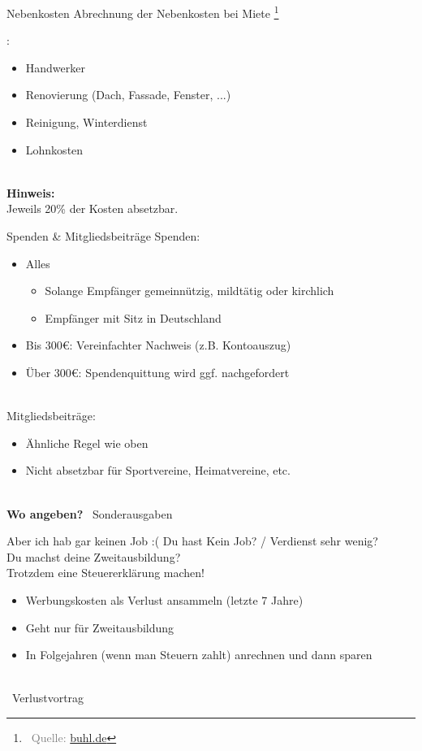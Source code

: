 \documentclass{beamer}
\newcommand{\n}{\hfill\\\vspace{0.25cm}}
\let\oldfootnote\footnote
\renewcommand{\footnote}[1]
{%
	\oldfootnote
	{
		\tiny
		\textcolor{gray}{\ #1}
	}%
}
\newcommand{\citeurl}[2]
{%
	\footnote{Quelle: \href{#1}{#2}}
}
\begin{document}
			\begin{frame}{Nebenkosten}
				Abrechnung der Nebenkosten bei Miete\citeurl{https://www.buhl.de/steuer/ratgeber/nebenkosten-abrechnung-absetzen}{buhl.de}:
				\begin{itemize}
					\item Handwerker
					\item Renovierung (Dach, Fassade, Fenster, ...)
					\item Reinigung, Winterdienst
					\item Lohnkosten
				\end{itemize}\n
				\textbf{Hinweis:}\\
				Jeweils 20\% der Kosten absetzbar.
			\end{frame}
		
			\begin{frame}{Spenden \& Mitgliedsbeiträge}
				Spenden:
				\begin{itemize}
					\item Alles
					\begin{itemize}
						\item Solange Empfänger gemeinnützig, mildtätig oder kirchlich
						\item Empfänger mit Sitz in Deutschland
					\end{itemize}
					\item Bis 300€: Vereinfachter Nachweis (z.B. Kontoauszug)
					\item Über 300€: Spendenquittung wird ggf. nachgefordert
				\end{itemize}\n\pause
				Mitgliedsbeiträge:
				\begin{itemize}
					\item Ähnliche Regel wie oben
					\item Nicht absetzbar für Sportvereine, Heimatvereine, etc.
				\end{itemize}\n\pause
				\textbf{Wo angeben?} \textrightarrow\ Sonderausgaben
			\end{frame}
		
			\begin{frame}{Aber ich hab gar keinen Job :(}
				Du hast Kein Job? / Verdienst sehr wenig?\\\pause
				Du machst deine Zweitausbildung?\\\pause
				Trotzdem eine Steuererklärung machen!\n\pause
				\begin{itemize}
					\item Werbungskosten als Verlust ansammeln (letzte 7 Jahre)
					\item Geht nur für Zweitausbildung
					\item In Folgejahren (wenn man Steuern zahlt) anrechnen und dann sparen
				\end{itemize}\n
				\textrightarrow\ Verlustvortrag
			\end{frame}
		
\end{document}
